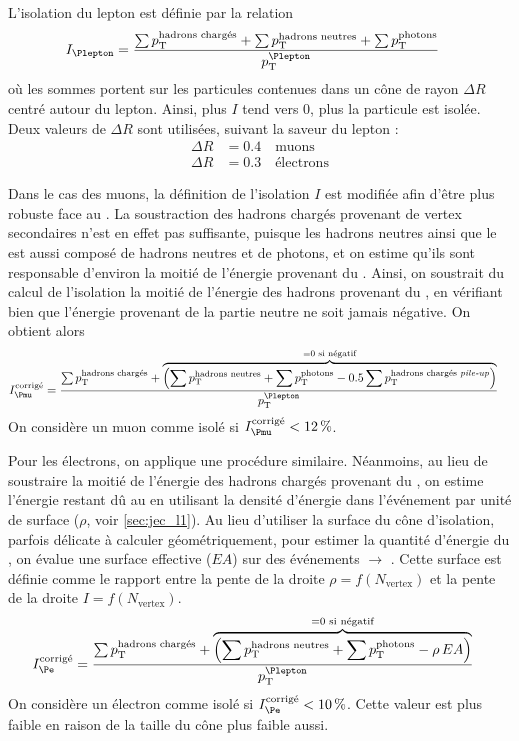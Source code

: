 L'isolation du lepton est définie par la relation
\begin{align*}
  I_{\Plepton} &= \frac{\sum{\pt^\text{hadrons chargés}} + \sum{\pt^\text{hadrons neutres}} + \sum{\pt^\text{photons}}}{\pt^{\Plepton}}
\end{align*}
où les sommes portent sur les particules contenues dans un cône de rayon $\Delta R$ centré autour du lepton. Ainsi, plus $I$ tend vers 0, plus la particule est isolée. Deux valeurs de $\Delta R$ sont utilisées, suivant la saveur du lepton :
\begin{align*}
  \Delta R &= \num{0.4} \quad\text{muons}\\
  \Delta R &= \num{0.3} \quad\text{électrons}
\end{align*}

Dans le cas des muons, la définition de l'isolation $I$ est modifiée afin d'être plus robuste face au \pu. La soustraction des hadrons chargés provenant de vertex secondaires n'est en effet pas suffisante, puisque les hadrons neutres ainsi que le \pu est aussi composé de hadrons neutres et de photons, et on estime qu'ils sont responsable d'environ la moitié de l'énergie provenant du \pu. Ainsi, on soustrait du calcul de l'isolation la moitié de l'énergie des hadrons provenant du \pu, en vérifiant bien que l'énergie provenant de la partie neutre ne soit jamais négative. On obtient alors
\begin{align*}
  I_{\Pmu}^\text{corrigé} &= \frac{\sum{\pt^\text{hadrons chargés}} + \overbrace{\left(\sum{\pt^\text{hadrons neutres}} + \sum{\pt^\text{photons}} - \num{0.5} \sum{\pt^\text{hadrons chargés \pu}} \right)}^{= 0 \text{ si négatif}}}{\pt^{\Plepton}}
\end{align*}
On considère un muon comme isolé si $I_{\Pmu}^\text{corrigé} < \SI{12}{\%}$.

Pour les électrons, on applique une procédure similaire. Néanmoins, au lieu de soustraire la moitié de l'énergie des hadrons chargés provenant du \pu, on estime l'énergie restant dû au \pu en utilisant la densité d'énergie dans l'événement par unité de surface ($\rho$, voir \cref{sec:jec_l1}). Au lieu d'utiliser la surface du cône d'isolation, parfois délicate à calculer géométriquement, pour estimer la quantité d'énergie du \pu, on évalue une surface effective ($EA$) sur des événements \PZ $\rightarrow$ \Pelectron{}\Ppositron. Cette surface est définie comme le rapport entre la pente de la droite $\rho = f(N_{\text{vertex}})$ et la pente de la droite $I = f(N_\text{vertex})$.
\begin{align*}
  I_{\Pe}^\text{corrigé} &= \frac{\sum{\pt^\text{hadrons chargés}} + \overbrace{\left(\sum{\pt^\text{hadrons neutres}} + \sum{\pt^\text{photons}} - \rho\,EA \right)}^{= 0 \text{ si négatif}}}{\pt^{\Plepton}}
\end{align*}
On considère un électron comme isolé si $I_{\Pe}^\text{corrigé} < \SI{10}{\%}$. Cette valeur est plus faible en raison de la taille du cône plus faible aussi.

